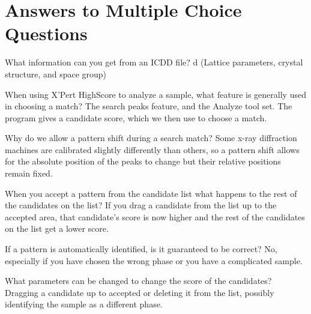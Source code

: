 \documentclass{article}
\begin{document}
\section{Answers to Multiple Choice Questions}
\begin{enumerate}[label=(\arabic*)]
\begin{item}
What information can you get from an ICDD file?
d (Lattice parameters, crystal structure, and space group)
\end{item}
\begin{item}
When using X'Pert HighScore to analyze a sample, what feature is generally used in choosing a match?
The search peaks feature, and the Analyze tool set. The program gives a candidate score, which we then use to choose a match. 
\end{item}
\begin{item}
Why do we allow a pattern shift during a search match?
Some x-ray diffraction machines are calibrated slightly differently than others, so a pattern shift allows for the absolute position of the peaks to change but their relative positions remain fixed. 
\end{item}
\begin{item}
When you accept a pattern from the candidate list what happens to the rest of the candidates on the list?
If you drag a candidate from the list up to the accepted area, that candidate's score is now higher and the rest of the candidates on the list get a lower score. 
\end{item}
\begin{item}
If a pattern is automatically identified, is it guaranteed to be correct? 
No, especially if you have chosen the wrong phase or you have a complicated sample.
\end{item}
\begin{item}
What parameters can be changed to change the score of the candidates?
 Dragging a candidate up to accepted or deleting it from the list, possibly identifying the sample as a different phase. 
\end{item}
\end{enumerate}






\end{document}
